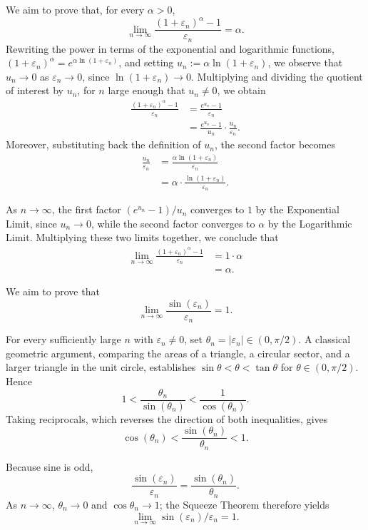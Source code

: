 \begin{remark}

We aim to prove that, for every $\alpha > 0$,
\[
\lim_{n \to \infty} \frac{(1+\varepsilon_n)^\alpha - 1}{\varepsilon_n} = \alpha.
\]
Rewriting the power in terms of the exponential and logarithmic functions, $(1+\varepsilon_n)^\alpha = e^{\alpha \ln(1+\varepsilon_n)}$, and setting $u_n := \alpha \ln(1+\varepsilon_n)$, we observe that $u_n \to 0$ as $\varepsilon_n \to 0$, since $\ln(1+\varepsilon_n) \to 0$. Multiplying and dividing the quotient of interest by $u_n$, for $n$ large enough that $u_n \neq 0$, we obtain
\[
\begin{aligned}
\frac{(1+\varepsilon_n)^\alpha - 1}{\varepsilon_n} &= \frac{e^{u_n}-1}{\varepsilon_n} \\
&= \frac{e^{u_n}-1}{u_n} \cdot \frac{u_n}{\varepsilon_n}.
\end{aligned}
\]
Moreover, substituting back the definition of $u_n$, the second factor becomes
\[
\begin{aligned}
\frac{u_n}{\varepsilon_n} &= \frac{\alpha \ln(1+\varepsilon_n)}{\varepsilon_n} \\
&= \alpha \cdot \frac{\ln(1+\varepsilon_n)}{\varepsilon_n}.
\end{aligned}
\]

As $n \to \infty$, the first factor $(e^{u_n}-1)/u_n$ converges to $1$ by the Exponential Limit, since $u_n \to 0$, while the second factor converges to $\alpha$ by the Logarithmic Limit. Multiplying these two limits together, we conclude that
\[
\begin{aligned}
\lim_{n \to \infty} \frac{(1+\varepsilon_n)^\alpha - 1}{\varepsilon_n} &= 1 \cdot \alpha \\
&= \alpha.
\end{aligned}
\]

\end{remark}

\begin{remark}

We aim to prove that
\[
\lim_{n \to \infty} \frac{\sin(\varepsilon_n)}{\varepsilon_n} = 1.
\]

For every sufficiently large $n$ with $\varepsilon_n\neq0$, set
$\theta_n=|\varepsilon_n|\in(0,\pi/2)$. A classical geometric argument,
comparing the areas of a triangle, a circular sector, and a larger triangle
in the unit circle, establishes
$\sin\theta<\theta<\tan\theta$ for $\theta\in(0,\pi/2)$. Hence
\[
1 < \frac{\theta_n}{\sin(\theta_n)} < \frac{1}{\cos(\theta_n)}.
\]
Taking reciprocals, which reverses the direction of both inequalities, gives
\[
\cos(\theta_n) < \frac{\sin(\theta_n)}{\theta_n} < 1.
\]

Because sine is odd,
\[
\frac{\sin(\varepsilon_n)}{\varepsilon_n}
=\frac{\sin(\theta_n)}{\theta_n}.
\]
As $n\to\infty$, $\theta_n\to0$ and $\cos\theta_n\to1$; the Squeeze
Theorem therefore yields
\[
\lim_{n \to \infty} \sin(\varepsilon_n)/\varepsilon_n = 1.
\]

\end{remark}

